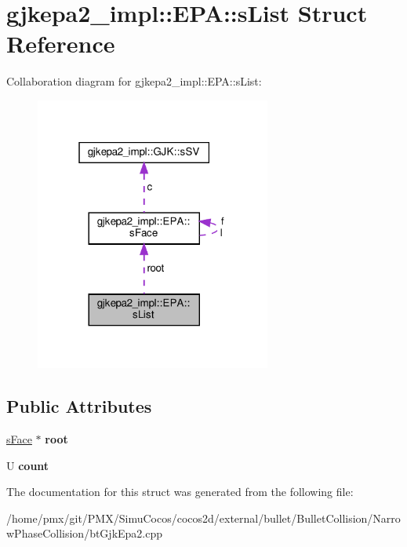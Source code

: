 \hypertarget{structgjkepa2__impl_1_1EPA_1_1sList}{}\section{gjkepa2\+\_\+impl\+:\+:E\+PA\+:\+:s\+List Struct Reference}
\label{structgjkepa2__impl_1_1EPA_1_1sList}


Collaboration diagram for gjkepa2\+\_\+impl\+:\+:E\+PA\+:\+:s\+List\+:
\nopagebreak
\begin{figure}[H]
\begin{center}
\leavevmode
\includegraphics[width=220pt]{structgjkepa2__impl_1_1EPA_1_1sList__coll__graph}
\end{center}
\end{figure}
\subsection*{Public Attributes}
\begin{DoxyCompactItemize}
\item 
\mbox{\label{structgjkepa2__impl_1_1EPA_1_1sList_a856f35452ebca0df771601426fcbb4d6}} 
\hyperlink{structgjkepa2__impl_1_1EPA_1_1sFace}{s\+Face} $\ast$ {\bfseries root}
\item 
\mbox{\label{structgjkepa2__impl_1_1EPA_1_1sList_a7be6d7567e0e23712e37955057be6eff}} 
U {\bfseries count}
\end{DoxyCompactItemize}


The documentation for this struct was generated from the following file\+:\begin{DoxyCompactItemize}
\item 
/home/pmx/git/\+P\+M\+X/\+Simu\+Cocos/cocos2d/external/bullet/\+Bullet\+Collision/\+Narrow\+Phase\+Collision/bt\+Gjk\+Epa2.\+cpp\end{DoxyCompactItemize}

